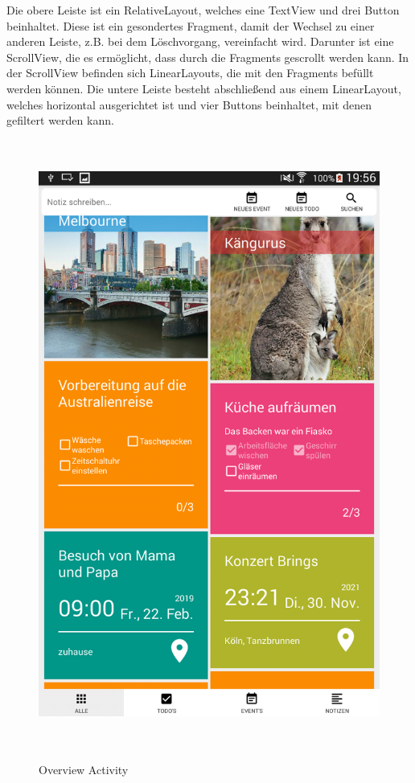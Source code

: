 Die obere Leiste ist ein RelativeLayout, welches eine TextView und drei Button beinhaltet. Diese ist ein gesondertes Fragment, damit der Wechsel zu einer anderen Leiste, z.B. bei dem Löschvorgang, vereinfacht wird. Darunter ist eine ScrollView, die es ermöglicht, dass durch die Fragments gescrollt werden kann. In der ScrollView befinden sich LinearLayouts, die mit den Fragments befüllt werden können. Die untere Leiste besteht abschließend aus einem LinearLayout, welches horizontal ausgerichtet ist und vier Buttons beinhaltet, mit denen gefiltert werden kann.

\begin{figure}[H]
\centering
\begin{minipage}[t]{1\textwidth} %
\caption{Overview Activity} %
\includegraphics[height=20cm]{img/Overview}\\ %
\end{minipage}
\end{figure}


